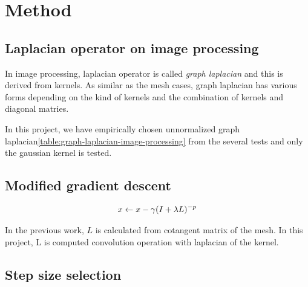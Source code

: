 \section*{Method}\label{ch:ch3label}

\subsection*{Laplacian operator on image processing}
In image processing, laplacian operator is called \emph{graph laplacian} and this is derived from kernels. As similar as the mesh cases, graph laplacian has various forms depending on the kind of kernels\cite{milanfar2012tour} and the combination of kernels and diagonal matries.

\begin{table}[!h]
	\centering
	\caption{graph laplacian in image processing}
	\label{table:graph-laplacian-image-processing}
\end{table}

In this project, we have empirically chosen unnormalized graph laplacian\ref{table:graph-laplacian-image-processing} from the several tests and only the gaussian kernel is tested. 

\subsection*{Modified gradient descent}
\begin{align}{\label{eq1}}
	x \leftarrow x - \gamma (I + \lambda L)^{-p} 
\end{align}

In the previous work\cite{Nicolet2021Large}, $L$ is calculated from cotangent matrix of the mesh. In this project, L is computed convolution operation with laplacian of the kernel. 

\subsection*{Step size selection}

